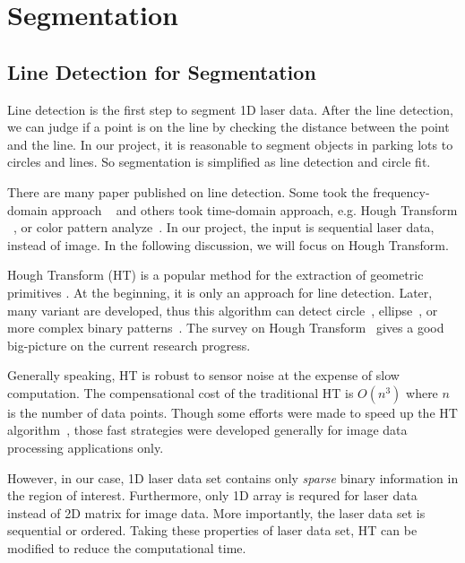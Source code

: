\documentclass{cdcarta4}
\begin{document}
 

\section{Segmentation}
\label{sec2}


\subsection{Line Detection for Segmentation}
\label{sec21}


Line detection is the first step to segment 1D laser data. After the line detection, we can judge if a point is on the line by checking the distance between the point and the line. In our project, it is reasonable to segment objects in parking lots to circles and lines. So segmentation is simplified as line detection and circle fit. 

There are many paper published on line detection. Some took the frequency-domain approach ~\cite{HuaLineFitting} and others took time-domain approach, e.g. Hough Transform ~\cite{HoughSurvey}, or color pattern analyze~\cite{Jan00model}. In our project, the input is sequential laser data, instead of image. In the following discussion, we will focus on Hough Transform.

%
Hough Transform (HT) is a popular method for the extraction of geometric primitives \cite{HoughSurvey,Atherton99CHT}. At the beginning, it is only an approach for line detection. Later, many variant are developed, thus this algorithm can detect circle~\cite{Atherton99CHT}, ellipse~\cite{guil97lower}, or more complex binary patterns~\cite{guil96new}. The survey on Hough Transform~\cite{HoughSurvey} gives a good big-picture on the current research progress. 

Generally speaking, HT is robust to sensor noise at the expense of slow computation. The compensational cost  of the traditional HT is   $O(n^3)$ where $n$ is the number of data points. Though some efforts were made to speed up the HT algorithm~\cite{matas98progressive}, those fast strategies were developed generally for  image data processing applications only. 


However, in our case,  1D laser data set
contains only {\em sparse}  
  binary information in the region of interest. Furthermore,  only 1D array is requred for laser data instead of 2D  matrix for image data. More importantly, 
 the laser data set is  sequential or ordered. Taking these properties of laser data set, HT can be modified to reduce the computational time. 
\end{document}
